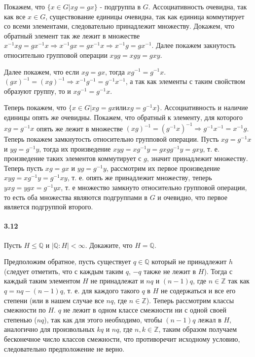 \documentclass[a4paper,12pt]{article}
\begin{document}
\begin{Solution}
Покажем, что $\{x \in G | xg = gx\}$ - подгруппа в $G$. Ассоциативность очевидна, так как все $x \in G$, существование единицы очевидна, так как единица коммутирует со всеми элементами, следовательно принадлежит множеству. Докажем, что обратный элемент так же лежит в множестве $x^{-1}x g = g x^{-1}x \Rightarrow x^{-1} g x = g x^{-1} x \Rightarrow x^{-1} g = g x^{-1}$. Далее покажем закнутость относительно групповой операции $xyg = xgy = gxy$.

Далее покажем, что если $xg = gx$, тогда $xg^{-1} = g^{-1}x$. $(gx)^{-1} = (xg)^{-1} \Rightarrow x^{-1}g^{-1} = g^{-1}x^{-1}$, а так как элементы с таким свойством образуют группу, то и $x g^{-1} = g^{-1} x$.

Теперь покажем, что $\{x \in G | xg = gx \text{или} xg=g^{-1}x\}$. Ассоциативность и наличие единицы опять же очевидны. Покажем, что обратный к элементу, для которого $xg = g^{-1}x$ опять же лежит в множестве $(xg)^{-1} = (g^{-1}x)^{-1} \Rightarrow g^{-1}x^{-1} = x^{-1}g$. Теперь покажем замкнутость относительно групповой операции. Пусть $xg = g^{-1}x$ и $yg = g^{-1}y$, тогда их произведение $xyg = xg^{-1}y = gxgg^{-1}y = gxy$, т. е. произведение таких элементов коммутирует с $g$, значит принадлежит множеству. Теперь пусть $xg = gx$ и $yg = g^{-1}y$, рассмотрим их первое произведение $xyg = x g^{-1} y = g^{-1} xy$, т. е. опять же принадлежит множеству, теперь $yxg = ygx = g^{-1}yx$, т. е множество замкнуто относительно групповой операции, то есть оба множества являются подгруппами в $G$ и очевидно, что первое является подгруппой второго.
\end{Solution}

\paragraph{3.12} Пусть $H \le \mathbb{Q}$ и $|\mathbb{Q} : H| < \infty$. Докажите, что $H = \mathbb{Q}$.

\begin{Solution}
Предположим обратное, пусть существует $q \in \mathbb{Q}$ который не принадлежит $h$ (следует отметить, что с каждым таким $q$, $-q$ также не лежит в $H$). Тогда с каждый таким элементом $H$ не принадлежат и $n q$ и $(n-1) q$, где $n \in \mathbb{Z}$ так как $q = n q - (n-1) q$, т. е. для каждого такого $q$ в $H$ не содержаться и все его степени (или в нашем случае все $n q$, где $n \in \mathbb{Z}$). Теперь рассмотрим классы смежности по $H$. $q$ не лежит в одном классе смежности ни с одной своей степенью ($nq$), так как для этого необходимо, чтобы $(n-1)q$ лежал в $H$, аналогично для произвольных $kq$ и $nq$, где $n,k \in \mathbb{Z}$, таким образом получаем бесконечное число классов смежности, что противоречит исходному условию, следовательно предположение не верно.
\end{Solution}
\end{document}
